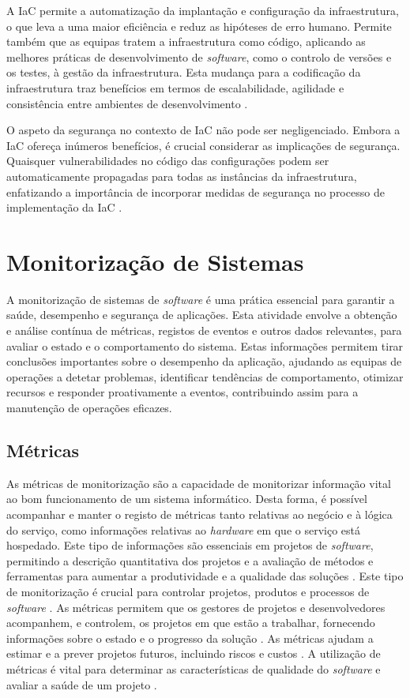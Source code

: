 A \ac{IaC} permite a automatização da implantação e configuração da infraestrutura, o que leva a 
uma maior eficiência e reduz as hipóteses de erro humano. Permite também que as equipas tratem a 
infraestrutura como código, aplicando as melhores práticas de desenvolvimento de \textit{software}, 
como o controlo de versões e os testes, à gestão da infraestrutura. Esta mudança para a codificação 
da infraestrutura traz benefícios em termos de escalabilidade, agilidade e consistência entre 
ambientes de desenvolvimento \cite{iac2023b}.

O aspeto da segurança no contexto de \ac{IaC} não pode ser negligenciado. Embora a \ac{IaC} 
ofereça inúmeros benefícios, é crucial considerar as implicações de segurança. Quaisquer 
vulnerabilidades no código das configurações podem ser automaticamente propagadas para todas as 
instâncias da infraestrutura, enfatizando a importância de incorporar medidas de segurança no 
processo de implementação da \ac{IaC} \cite{iac2023}.

\section{Monitorização de Sistemas}

A monitorização de sistemas de \textit{software} é uma prática essencial para garantir a saúde, 
desempenho e segurança de aplicações. Esta atividade envolve a obtenção e análise contínua de métricas, 
registos de eventos e outros dados relevantes, para avaliar o estado e o comportamento 
do sistema. Estas informações permitem tirar conclusões importantes sobre o desempenho da aplicação, 
ajudando as equipas de operações a detetar problemas, identificar tendências de comportamento, 
otimizar recursos e responder proativamente a eventos, contribuindo assim para a manutenção de 
operações eficazes.

\subsection{Métricas}
\label{sec:metrics}

As métricas de monitorização são a capacidade de monitorizar informação vital ao bom funcionamento
de um sistema informático. Desta forma, é possível acompanhar e manter o registo de métricas tanto
relativas ao negócio e à lógica do serviço, como informações relativas ao \textit{hardware} em que
o serviço está hospedado. Este tipo de informações são essenciais em projetos de \textit{software}, 
permitindo a descrição quantitativa dos projetos e a avaliação de métodos e ferramentas para 
aumentar a produtividade e a qualidade das soluções \cite{metrics2003}. Este tipo de monitorização 
é crucial para controlar projetos, produtos e processos de \textit{software} \cite{metrics2019}. 
As métricas permitem que os gestores de projetos e desenvolvedores acompanhem, e controlem, os 
projetos em que estão a trabalhar, fornecendo informações sobre o estado e o progresso da solução 
\cite{metrics2016}. As métricas ajudam a estimar e a prever projetos futuros, incluindo riscos e 
custos \cite{metrics2016b}. A utilização de métricas é vital para determinar as características de 
qualidade do \textit{software} e avaliar a saúde de um projeto \cite{metrics2015}.


